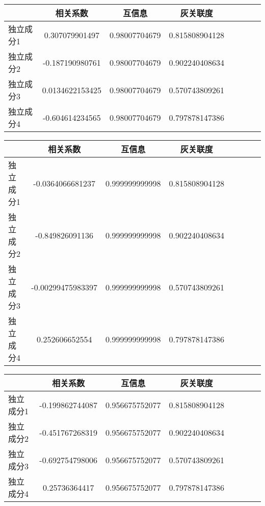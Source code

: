 
\begin{table}[!tphb] 
\begin{center}
\begin{tabular}{lccclccc} 
 \toprule 
& 相关系数   & 互信息    &灰关联度 \\ 
\midrule 
独立成分1	& 0.307079901497	& 0.98007704679	& 0.815808904128	\\ 
独立成分2	& -0.187190980761	& 0.98007704679	& 0.902240408634	\\ 
独立成分3	& 0.0134622153425	& 0.98007704679	& 0.570743809261	\\ 
独立成分4	& -0.604614234565	& 0.98007704679	& 0.797878147386	\\ 
\bottomrule 
 \end{tabular} 
\end{center} 
 \end{table} 


\begin{table}[!tphb] 
\begin{center}
\begin{tabular}{lccclccc} 
 \toprule 
& 相关系数   & 互信息    &灰关联度 \\ 
\midrule 
独立成分1	& -0.0364066681237	& 0.999999999998	& 0.815808904128	\\ 
独立成分2	& -0.849826091136	& 0.999999999998	& 0.902240408634	\\ 
独立成分3	& -0.00299475983397	& 0.999999999998	& 0.570743809261	\\ 
独立成分4	& 0.252606652554	& 0.999999999998	& 0.797878147386	\\ 
\bottomrule 
 \end{tabular} 
\end{center} 
 \end{table} 


\begin{table}[!tphb] 
\begin{center}
\begin{tabular}{lccclccc} 
 \toprule 
& 相关系数   & 互信息    &灰关联度 \\ 
\midrule 
独立成分1	& -0.199862744087	& 0.956675752077	& 0.815808904128	\\ 
独立成分2	& -0.451767268319	& 0.956675752077	& 0.902240408634	\\ 
独立成分3	& -0.692754798006	& 0.956675752077	& 0.570743809261	\\ 
独立成分4	& 0.25736364417	& 0.956675752077	& 0.797878147386	\\ 
\bottomrule 
 \end{tabular} 
\end{center} 
 \end{table} 


